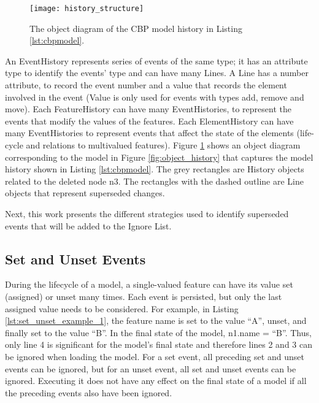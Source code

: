 \begin{figure}[ht]
\centering
\texttt{[image: history\_structure]}
\caption{The object diagram of the CBP model history in Listing \ref{lst:cbpmodel}.}
\label{fig:history_structure}
\end{figure}

An \textsf{EventHistory} represents series of events of the same type; it has an attribute \textsf{type} to identify the events' type and can have many \textsf{Line}s. A \textsf{Line} has a \textsf{number} attribute, to record the event number and a \textsf{value} that records the element involved in the event (Value is only used for events with types \textsf{add}, \textsf{remove} and \textsf{move}). Each \textsf{FeatureHistory} can have many \textsf{EventHistories}, to represent the events that modify the values of the features. Each \textsf{ElementHistory} can have many \textsf{EventHistories} to represent events that affect the state of the elements (life-cycle and relations to multivalued features). Figure \ref{fig:history_structure} shows an object diagram corresponding to the model in Figure \ref{fig:object_history} that captures the model history shown in Listing \ref{lst:cbpmodel}. The grey rectangles are \textsf{History} objects related to the deleted node \textsf{n3}. The rectangles with the dashed outline are \textsf{Line} objects that represent superseded changes. 

Next, this work presents the different strategies used to identify superseded events that will be added to the Ignore List.   

\subsection{Set and Unset Events}
\label{subsec:set_and_unset_operations}
During the lifecycle of a model, a single-valued feature can have its value set (assigned) or unset many times. Each event is persisted, but only the last assigned value needs to be considered. For example, in Listing \ref{lst:set_unset_example_1}, the feature \textsf{name} is set to the value ``A'', unset, and finally set to the value ``B''.  In the final state of the model, \textsf{n1.name} = ``B''. Thus, only line 4 is significant for the model's final state and therefore lines 2 and 3 can be ignored when loading the model. For a \textsf{set} event, all preceding \textsf{set} and \textsf{unset} events can be ignored, but for an \textsf{unset} event, all \textsf{set} and \textsf{unset} events can be ignored. Executing it does not have any effect on the final state of a model if all the preceding events also have been ignored.

